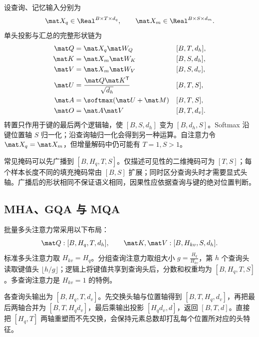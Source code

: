 \documentclass[../textbook.tex]{subfiles}
\begin{document}
设查询、记忆输入分别为
\begin{equation}
 \mat X_q\in\Real^{B\times T\times d_q},\qquad
 \mat X_m\in\Real^{B\times S\times d_m}.
\end{equation}
单头投影与汇总的完整形状链为
\begin{align}
 \mat Q&=\mat X_q\mat W_Q &&[B,T,d_h],\\
 \mat K&=\mat X_m\mat W_K &&[B,S,d_h],\\
 \mat V&=\mat X_m\mat W_V &&[B,S,d_v],\\
 \mat U&=\frac{\mat Q\mat K^{\mathsf T}}{\sqrt{d_h}} &&[B,T,S],\\
 \mat A&=\softmax(\mat U+\mat M) &&[B,T,S],\\
 \mat O&=\mat A\mat V &&[B,T,d_v].
\end{align}
转置只作用于键的最后两个逻辑轴，使 $[B,S,d_h]$ 变为 $[B,d_h,S]$。Softmax 沿键位置轴 $S$ 归一化；沿查询轴归一化会得到另一种运算。自注意力令 $\mat X_q=\mat X_m$，但增量解码中仍可能有 $T=1,S>1$。

常见掩码可以先广播到 $[B,H_q,T,S]$。仅描述可见性的二维掩码可为 $[T,S]$；每个样本长度不同的填充掩码常由 $[B,S]$ 扩展；同时区分查询头时才需要显式头轴。广播后的形状相同不保证语义相同，因果性应依据查询与键的绝对位置判断。

\subsection{MHA、GQA 与 MQA}

批量多头注意力常采用以下布局：
\begin{equation}
 \mat Q:[B,H_q,T,d_h],\qquad
 \mat K,\mat V:[B,H_{kv},S,d_h].
\end{equation}
标准多头注意力取 $H_{kv}=H_q$。分组查询注意力取组大小 $g=\frac{H_q}{H_{kv}}$，第 $h$ 个查询头读取键值头 $\lfloor h/g\rfloor$；逻辑上将键值共享到查询头后，分数和权重均为 $[B,H_q,T,S]$。多查询注意力是 $H_{kv}=1$ 的特例。

各查询头输出为 $[B,H_q,T,d_v]$。先交换头轴与位置轴得到 $[B,T,H_q,d_v]$，再把最后两轴合并为 $[B,T,H_qd_v]$，最后乘输出投影 $[H_qd_v,d]$，返回 $[B,T,d]$。直接把 $[H_q,T]$ 两轴重塑而不先交换，会保持元素总数却打乱每个位置所对应的头特征。
\end{document}
